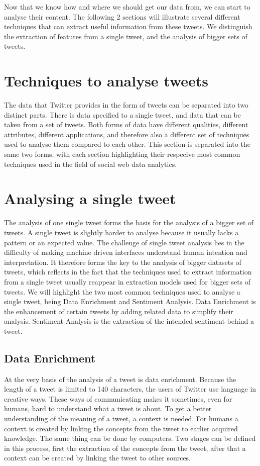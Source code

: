 \documentclass{article}
\begin{document}
Now that we know how and where we should get our data from, we can start to analyse their content. The following 2 sections will illustrate
several different techniques that can extract useful information from these tweets. We distinguish the extraction of features from a single tweet,
and the analysis of bigger sets of tweets.

\section{Techniques to analyse tweets}

The data that Twitter provides in the form of tweets can be separated into two distinct parts. There is data specified to a single tweet, 
and data that can be taken from a set of tweets. Both forms of data have different qualities, different attributes, different applications, and therefore
also a different set of techniques used to analyse them compared to each other. This section is separated into the same two forms, with each section
highlighting their respecive most common techniques used in the field of social web data analytics.

\section*{Analysing a single tweet}

The analysis of one single tweet forms the basis for the analysis of a bigger set of tweets. A single tweet is slightly harder to analyse because it usually
lacks a pattern or an expected value. The challenge of single tweet analysis lies in the difficulty of making machine driven interfaces understand human
intention and interpretation. It therefore forms the key to the analysis of bigger datasets of tweets, which reflects in the fact that the techniques used 
to extract information from a single tweet usually reappear in extraction models used for bigger sets of tweets. 
We will highlight the two most common techniques used to analyse a single tweet, being Data Enrichment and Sentiment Analysis. Data Enrichment is the
enhancement of certain tweets by adding related data to simplify their analysis. Sentiment Analysis is the extraction of the intended sentiment behind a tweet.

\subsection{Data Enrichment}

At the very basis of the analysis of a tweet is data enrichment. Because the length of a tweet is limited to 140 characters, 
the users of Twitter use language in creative ways. These ways of communicating makes it sometimes, even for humans, hard to understand what a tweet is about. 
To get a better understanding of the meaning of a tweet, a context is needed. For humans a context is created by linking the concepts from the tweet to 
earlier acquired knowledge. The same thing can be done by computers. Two stages can be defined in this process, first the extraction of the concepts from 
the tweet, after that a context can be created by linking the tweet to other sources.
\end{document}
